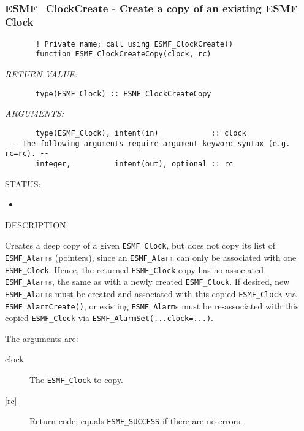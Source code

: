  
\mbox{}\hrulefill\ 
 
\subsubsection [ESMF\_ClockCreate] {ESMF\_ClockCreate - Create a copy of an existing ESMF Clock}


 
\begin{verbatim}       ! Private name; call using ESMF_ClockCreate()
       function ESMF_ClockCreateCopy(clock, rc)
 \end{verbatim}{\em RETURN VALUE:}
\begin{verbatim}       type(ESMF_Clock) :: ESMF_ClockCreateCopy
 \end{verbatim}{\em ARGUMENTS:}
\begin{verbatim}       type(ESMF_Clock), intent(in)            :: clock
 -- The following arguments require argument keyword syntax (e.g. rc=rc). --
       integer,          intent(out), optional :: rc
 \end{verbatim}
{\sf STATUS:}
   \begin{itemize}
   \item{}
   \end{itemize}
  
{\sf DESCRIPTION:\\ }


       Creates a deep copy of a given {\tt ESMF\_Clock}, but does not copy its
       list of {\tt ESMF\_Alarm}s (pointers), since an {\tt ESMF\_Alarm} can only
       be associated with one {\tt ESMF\_Clock}.  Hence, the returned
       {\tt ESMF\_Clock} copy has no associated {\tt ESMF\_Alarm}s, the same as
       with a newly created {\tt ESMF\_Clock}.  If desired, new
       {\tt ESMF\_Alarm}s must be created and associated with this copied
       {\tt ESMF\_Clock} via {\tt ESMF\_AlarmCreate()}, or existing
       {\tt ESMF\_Alarm}s must be re-associated with this copied
       {\tt ESMF\_Clock} via {\tt ESMF\_AlarmSet(...clock=...)}.
  
       The arguments are:
       \begin{description}
       \item[clock]
          The {\tt ESMF\_Clock} to copy.
       \item[{[rc]}]
          Return code; equals {\tt ESMF\_SUCCESS} if there are no errors.
       \end{description}
   
